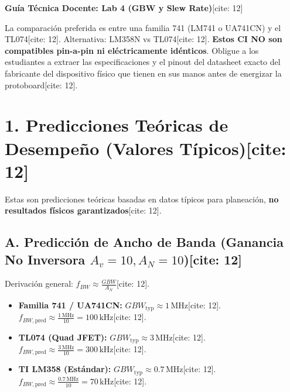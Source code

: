 \documentclass[11pt, a4paper]{article}
\begin{document}
\begin{center}
    \Large\textbf{\textcolor{ucbblue}{Guía Técnica Docente: Lab 4 (GBW y Slew Rate)}}[cite: 12]
\end{center}

\begin{tcolorbox}[colback=yellow!5, colframe=ucbblue, title=\textbf{Estrategia de Dispositivos y Advertencia[cite: 12]}]
    La comparación preferida es entre una familia 741 (LM741 o UA741CN) y el TL074[cite: 12]. Alternativa: LM358N vs TL074[cite: 12]. \textbf{Estos CI NO son compatibles pin-a-pin ni eléctricamente idénticos}. Obligue a los estudiantes a extraer las especificaciones y el pinout del datasheet exacto del fabricante del dispositivo físico que tienen en sus manos antes de energizar la protoboard[cite: 12].
\end{tcolorbox}

\section*{1. Predicciones Teóricas de Desempeño (Valores Típicos)[cite: 12]}
Estas son predicciones teóricas basadas en datos típicos para planeación, \textbf{no resultados físicos garantizados}[cite: 12].

\subsection*{A. Predicción de Ancho de Banda (Ganancia No Inversora $A_v=10, A_N=10$)[cite: 12]}
Derivación general: $f_{BW} \approx \frac{GBW}{A_N}$[cite: 12].
\begin{itemize}
    \item \textbf{Familia 741 / UA741CN:} $GBW_{\mathrm{typ}} \approx 1\,\text{MHz}$[cite: 12]. \\
    $f_{BW, \mathrm{pred}} \approx \frac{1\,\text{MHz}}{10} = \boxed{100\,\text{kHz}}$[cite: 12].
    \item \textbf{TL074 (Quad JFET):} $GBW_{\mathrm{typ}} \approx 3\,\text{MHz}$[cite: 12]. \\
    $f_{BW, \mathrm{pred}} \approx \frac{3\,\text{MHz}}{10} = \boxed{300\,\text{kHz}}$[cite: 12].
    \item \textbf{TI LM358 (Estándar):} $GBW_{\mathrm{typ}} \approx 0.7\,\text{MHz}$[cite: 12]. \\
    $f_{BW, \mathrm{pred}} \approx \frac{0.7\,\text{MHz}}{10} = \boxed{70\,\text{kHz}}$[cite: 12].
\end{itemize}
\end{document}
